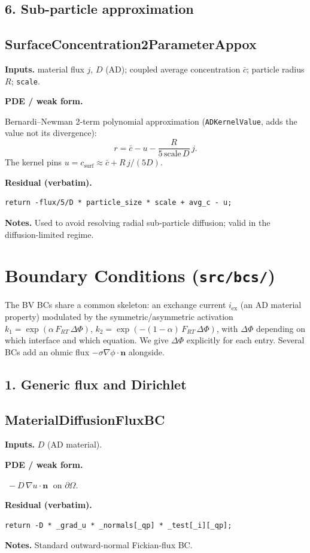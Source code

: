 \documentclass[11pt]{article}
\newcommand{\nvec}{\mathbf{n}}
\newenvironment{ecmEntry}[1]{%
  \subsection{#1}%
}{}
\newcommand{\inputsRow}[1]{\par\noindent\textbf{Inputs.} #1\par}
\newcommand{\pdeRow}[1]{\par\noindent\textbf{PDE / weak form.}\par #1\par}
\newcommand{\codeRow}{\par\noindent\textbf{Residual (verbatim).}\par}
\newcommand{\notesRow}[1]{\par\noindent\textbf{Notes.} #1\par}
\begin{document}
\subsection*{6. Sub-particle approximation}

\begin{ecmEntry}{SurfaceConcentration2ParameterAppox}
\inputsRow{material flux $j$, $D$ (AD); coupled average concentration $\bar c$;
particle radius $R$; \texttt{scale}.}
\pdeRow{Bernardi--Newman 2-term polynomial approximation (\texttt{ADKernelValue},
adds the value not its divergence):
\[
  r = \bar c - u - \frac{R}{5\,\mathrm{scale}\,D}\,j.
\]
The kernel pins $u = c_{\text{surf}} \approx \bar c + R\,j/(5D)$.}
\codeRow\begin{lstlisting}
return -flux/5/D * particle_size * scale + avg_c - u;
\end{lstlisting}
\notesRow{Used to avoid resolving radial sub-particle diffusion; valid in the
diffusion-limited regime.}
\end{ecmEntry}

\section{Boundary Conditions (\texttt{src/bcs/})}

The BV BCs share a common skeleton: an exchange current $i_{\text{ex}}$ (an AD material
property) modulated by the symmetric/asymmetric activation
$k_1 = \exp(\alpha\,F_{RT}\,\Delta\Phi)$, $k_2=\exp(-(1-\alpha)\,F_{RT}\,\Delta\Phi)$, with
$\Delta\Phi$ depending on which interface and which equation. We give $\Delta\Phi$ explicitly
for each entry. Several BCs add an ohmic flux $-\sigma\nabla\phi\cdot\nvec$ alongside.

\subsection*{1. Generic flux and Dirichlet}

\begin{ecmEntry}{MaterialDiffusionFluxBC}
\inputsRow{$D$ (AD material).}
\pdeRow{$\;-D\,\nabla u\cdot\nvec\;$ on $\partial\Omega$.}
\codeRow\begin{lstlisting}
return -D * _grad_u * _normals[_qp] * _test[_i][_qp];
\end{lstlisting}
\notesRow{Standard outward-normal Fickian-flux BC.}
\end{ecmEntry}
\end{document}
